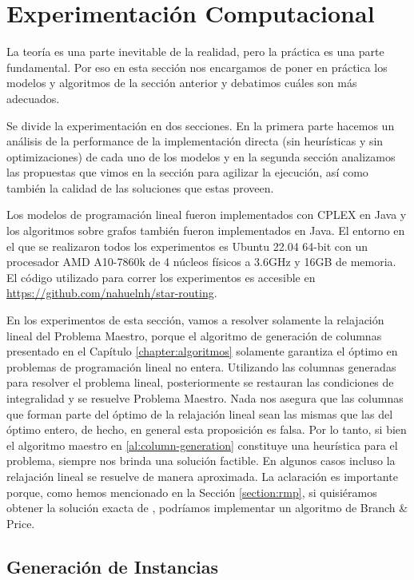 \chapter{Experimentación Computacional}
\label{ch:experiments}

La teoría es una parte inevitable de la realidad, pero la práctica es una parte fundamental. Por eso en esta sección nos encargamos de poner en práctica los modelos y algoritmos de la sección anterior y debatimos cuáles son más adecuados. 

Se divide la experimentación en dos secciones. En la primera parte hacemos un análisis de la performance de la implementación directa (sin heurísticas y sin optimizaciones) de cada uno de los modelos y en la segunda sección analizamos las propuestas que vimos en la sección \label{ch:algoritmos} para agilizar la ejecución, así como también la calidad de las soluciones que estas proveen.

Los modelos de programación lineal fueron implementados con CPLEX en Java y los algoritmos sobre grafos también fueron implementados en Java. El entorno en el que se realizaron todos los experimentos es Ubuntu 22.04 64-bit con un procesador AMD A10-7860k de 4 núcleos físicos a 3.6GHz y 16GB de memoria.
El código utilizado para correr los experimentos es accesible en \url{https://github.com/nahuelnh/star-routing}.

En los experimentos de esta sección, vamos a resolver solamente la relajación lineal del Problema Maestro, porque el algoritmo de generación de columnas presentado en el Capítulo \ref{chapter:algoritmos} solamente garantiza el óptimo en problemas de programación lineal no entera. Utilizando las columnas generadas para resolver el problema lineal, posteriormente se restauran las condiciones de integralidad y se resuelve Problema Maestro. Nada nos asegura que las columnas que forman parte del óptimo de la relajación lineal sean las mismas que las del óptimo entero, de hecho, en general esta proposición es falsa. Por lo tanto, si bien el algoritmo maestro en \ref{al:column-generation} constituye una heurística para el problema, siempre nos brinda una solución factible. En algunos casos incluso la relajación lineal se resuelve de manera aproximada. La aclaración es importante porque, como hemos mencionado en la Sección \ref{section:rmp}, si quisiéramos obtener la solución exacta de , podríamos implementar un algoritmo de Branch \& Price. 


\section{Generación de Instancias}

